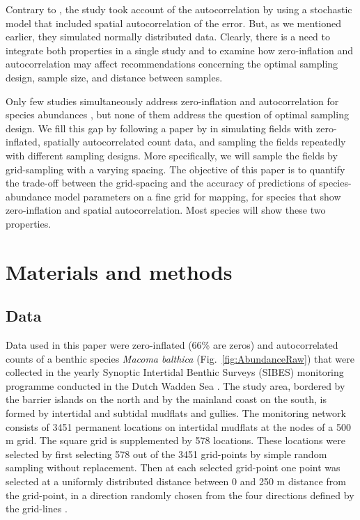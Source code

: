 \documentclass[review]{elsarticle}
\begin{document}
Contrary to \citet{tyre2003}, the \citeauthor{bijleveld2012} study took account of the autocorrelation by using a stochastic model that included spatial autocorrelation of the error. But, as we mentioned earlier, they simulated normally distributed data. Clearly, there is a need to integrate both properties in a single study and to examine how zero-inflation and autocorrelation may affect recommendations concerning the optimal sampling design, sample size, and distance between samples.

Only few studies simultaneously address zero-inflation and autocorrelation for species abundances \citep[see e.g.][]{recta2012, boyd2015}, but none of them address the question of optimal sampling design.  We fill this gap by following a paper by \citet{lyashevska2015a} in simulating fields with zero-inflated, spatially autocorrelated count data, and sampling the fields repeatedly with different sampling designs. More specifically, we will sample the fields by grid-sampling with a varying spacing. The objective of this paper is to quantify the trade-off between the grid-spacing and the accuracy of predictions of species-abundance model parameters on a fine grid for mapping, for species that show zero-inflation and spatial autocorrelation. Most species will show these two properties.

\section{Materials and methods} \label{sec:methods}


\subsection{Data}

Data used in this paper were zero-inflated (66\% are zeros) and autocorrelated counts of a benthic species \textit{Macoma balthica} (Fig.~\ref{fig:AbundanceRaw}) that were collected in the yearly Synoptic Intertidal Benthic Surveys (SIBES) monitoring programme conducted in the Dutch Wadden Sea \citep{bijleveld2012, compton2013}. The study area, bordered by the barrier islands on the north and by the mainland coast on the south, is formed by intertidal and subtidal mudflats and gullies. The monitoring network consists of 3451 permanent locations on intertidal mudflats at the nodes of a 500 m grid. The square grid is supplemented by 578 locations. These locations were selected by first selecting 578 out of the 3451 grid-points by simple random sampling without replacement. Then at each selected grid-point one point was selected at a uniformly distributed distance between 0 and 250 m distance from the grid-point, in a direction randomly chosen from the four directions defined by the grid-lines \citep{bijleveld2012}.
\end{document}

